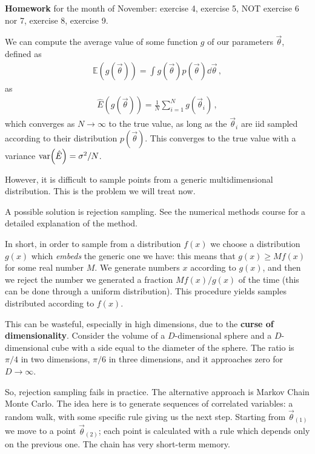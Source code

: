 \documentclass[main.tex]{subfiles}
\begin{document}

\textbf{Homework} for the month of November: exercise 4, exercise 5, NOT exercise 6 nor 7, exercise 8, exercise 9.

We can compute the average value of some function \(g\) of our parameters \(\vec{\theta}\), defined as 
%
\begin{align}
\mathbb{E} (g(\vec{\theta})) = \int g(\vec{\theta}) p(\vec{\theta}) \dd{\vec{\theta}}
\,,
\end{align}
%
as 
%
\begin{align}
\hat{E} (g(\vec{\theta})) = \frac{1}{N} \sum _{i=1}^{N} g(\vec{\theta}_i)
\,,
\end{align}
%
which converges as \(N \to \infty \) to the true value, as long as the \(\vec{\theta}_i\) are iid sampled according to their distribution \(p(\vec{\theta})\).
This converges to the true value with a variance \(\text{var} \qty(\hat{E}) = \sigma^2 / N\). 

However, it is difficult to sample points from a generic multidimensional distribution. 
This is the problem we will treat now. 

A possible solution is rejection sampling. See the numerical methods course for a detailed explanation of the method. 

In short, in order to sample from a distribution \(f(x)\) we choose a distribution \(g(x)\) which \emph{embeds} the generic one we have: this means that \(g(x) \geq M f(x)\) for some real number \(M\). 
We generate numbers \(x\) according to \(g(x)\), and then we reject the number we generated a fraction \(M f(x) / g(x)\) of the time (this can be done through a uniform distribution).
This procedure yields samples distributed according to \(f(x)\).

This can be wasteful, especially in high dimensions, due to the \textbf{curse of dimensionality}. 
Consider the volume of a \(D\)-dimensional sphere and a \(D\)-dimensional cube with a side equal to the diameter of the sphere. 
The ratio is \(\pi /4\) in two dimensions, \(\pi /6\) in three dimensions, and it approaches zero for \(D \to \infty \).

So, rejection sampling fails in practice. 
The alternative approach is Markov Chain Monte Carlo. 
The idea here is to generate sequences of correlated variables: a random walk, with some specific rule giving us the next step. 
Starting from \(\vec{\theta}_{(1)}\) we move to a point \(\vec{\theta}_{(2)}\); each point is calculated with a rule which depends only on the previous one.
The chain has very short-term memory. 
\end{document}
